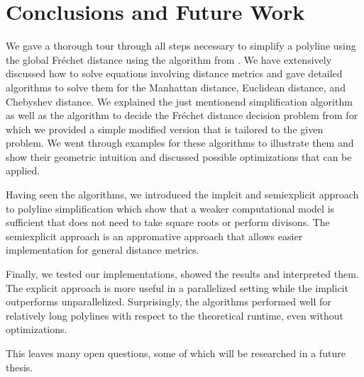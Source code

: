 \section{Conclusions and Future Work}
\label{sec:discussion_conclusion}
We gave a thorough tour through all steps necessary to simplify a polyline using the global Fréchet distance using the algorithm from \citeauthor{on_optimal_polyline_simplification_using_the_hausdorff_and_frechet_distance}. We have extensively discussed how to solve equations involving distance metrics and gave detailed algorithms to solve them for the Manhattan distance, Euclidean distance, and Chebyshev distance. We explained the just mentionend simplification algorithm as well as the algorithm to decide the Fréchet distance decision problem from \citeauthor{computing_the_frechet_distance_between_two_polygonal_curves} for which we provided a simple modified version that is tailored to the given problem. We went through examples for these algorithms to illustrate them and show their geometric intuition and discussed possible optimizations that can be applied. 

Having seen the algorithms, we introduced the implcit and semiexplicit approach to polyline simplification which show that a weaker computational model is sufficient that does not need to take square roots or perform divisons. The semiexplicit approach is an appromative approach that allows easier implementation for general distance metrics. 

Finally, we tested our implementations, showed the results and interpreted them. The explicit approach is more useful in a parallelized setting while the implicit outperforms unparallelized. Surprisingly, the algorithms performed well for relatively long polylines with respect to the theoretical runtime, even without optimizations. 

This leaves many open questions, some of which will be researched in a future thesis. 

